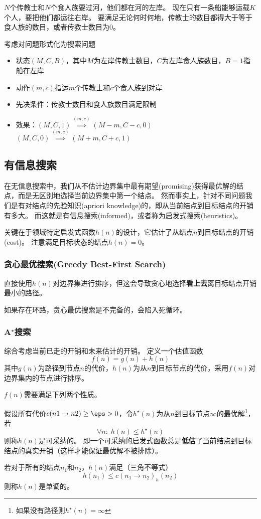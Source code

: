 \begin{example}
$N$个传教士和$N$个食人族要过河，他们都在河的左岸。
现在只有一条船能够运载$K$个人，要把他们都运往右岸。
要满足无论何时何地，传教士的数目都得大于等于食人族的数目，或者传教士数目为0。
\end{example}
\begin{analysis}
考虑对问题形式化为搜索问题
\begin{itemize}
	\item 状态$(M,C,B)$，其中$M$为左岸传教士数目，$C$为左岸食人族数目，$B=1$指船在左岸
	\item 动作$(m,c)$指运$m$个传教士和$c$个食人族到对岸
	\item 先决条件：传教士数目和食人族数目满足限制
	\item 效果：$(M,C,1)\stackrel{(m,c)}{\implies}(M-m,C-c,0)$\\
	$(M,C,0)\stackrel{(m,c)}{\implies}(M+m,C+c,1)$
\end{itemize}
\end{analysis}

\subsection{有信息搜索}
在无信息搜索中，我们从不估计边界集中最有期望(promising)获得最优解的结点，而是无区别地选择当前边界集中第一个结点。
然而事实上，针对不同问题我们是有对结点的先验知识(apriori knowledge)的，即从当前结点到目标结点的开销有多大。
而这就是有信息搜索(informed)，或者称为启发式搜索(heuristics)。

关键在于领域特定启发式函数$h(n)$的设计，它估计了从结点$n$到目标结点的开销(cost)。
注意满足目标状态的结点$h(n)=0$。

\subsubsection{贪心最优搜索(Greedy Best-First Search)}
直接使用$h(n)$对边界集进行排序，但这会导致贪心地选择\textbf{看上去}离目标结点开销最小的路径。

如果存在环路，贪心最优搜索是不完备的，会陷入死循环。

\subsubsection{A$^\star$搜索}
综合考虑当前已走的开销和未来估计的开销。
定义一个估值函数
\[f(n)=g(n)+h(n)\]
其中$g(n)$为路径到节点$n$的代价，$h(n)$为从$n$到目标节点的代价，采用$f(n)$对边界集内的节点进行排序。

$f(n)$需要满足下列两个性质。
\begin{definition}
假设所有代价$c(n1\to n2)\geq\eps>0$，令$h^\star(n)$为从$n$到目标节点$\infty$的最优解\footnote{如果没有路径则$h^\star(n)=\infty$}，若
\[\forall n:\;h(n)\leq h^\star(n)\]
则称$h(n)$是可采纳的。
即一个可采纳的启发式函数总是\textbf{低估}了当前结点到目标结点的真实开销（这样才能保证最优解不被排除）。
\end{definition}
\begin{definition}
若对于所有的结点$n_1$和$n_2$，$h(n)$满足（三角不等式）
\[h(n_1)\leq c(n_1\to n_2)_h(n_2)\]
则称$h(n)$是单调的。
\end{definition}

